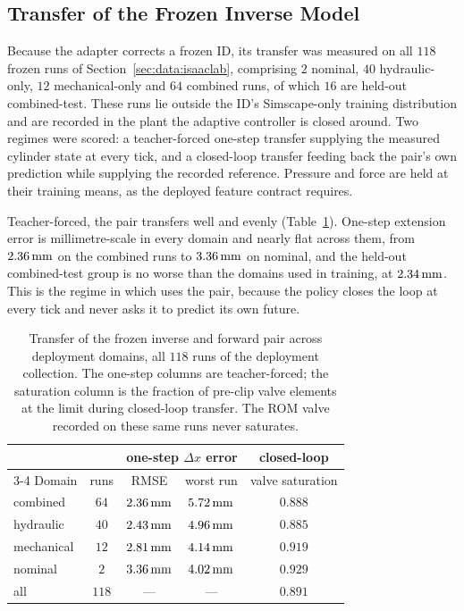 \subsection{Transfer of the Frozen Inverse Model}
\label{sec:models:id-trust}

Because the adapter corrects a frozen ID, its transfer was measured on all $118$
frozen runs of Section~\ref{sec:data:isaaclab}, comprising $2$ nominal, $40$
hydraulic-only, $12$ mechanical-only and $64$ combined runs, of which $16$ are
held-out combined-test. These runs lie outside the ID's Simscape-only training
distribution and are recorded in the plant the adaptive controller is closed
around. Two regimes were scored: a teacher-forced one-step transfer supplying
the measured cylinder state at every tick, and a closed-loop transfer feeding
back the pair's own prediction while supplying the recorded reference. Pressure
and force are held at their training means, as the deployed feature contract
requires.

Teacher-forced, the pair transfers well and evenly
(Table~\ref{tab:models:id-trust}). One-step extension error is millimetre-scale
in every domain and nearly flat across them, from $\unit[2.36]{mm}$ on the
combined runs to $\unit[3.36]{mm}$ on nominal, and the held-out combined-test
group is no worse than the domains used in training, at $\unit[2.34]{mm}$. This
is the regime in which \ppoIDFD{} uses the pair, because the policy closes the
loop at every tick and never asks it to predict its own future.

\begin{table}[tb]
  \centering
  \caption{Transfer of the frozen inverse and forward pair across deployment
  domains, all $118$ runs of the deployment collection. The one-step columns
  are teacher-forced; the saturation column is the fraction of pre-clip valve
  elements at the limit during closed-loop transfer. The ROM valve recorded on
  these same runs never saturates.}
  \label{tab:models:id-trust}
  \begin{tabular}{lcccc}
    \toprule
    & & \multicolumn{2}{c}{one-step $\Delta x$ error}
    & closed-loop \\
    \cmidrule(lr){3-4}
    Domain & runs & RMSE & worst run & valve saturation \\
    \midrule
    combined   & $64$ & $\unit[2.36]{mm}$ & $\unit[5.72]{mm}$ & $0.888$ \\
    hydraulic  & $40$ & $\unit[2.43]{mm}$ & $\unit[4.96]{mm}$ & $0.885$ \\
    mechanical & $12$ & $\unit[2.81]{mm}$ & $\unit[4.14]{mm}$ & $0.919$ \\
    nominal    & $2$  & $\unit[3.36]{mm}$ & $\unit[4.02]{mm}$ & $0.929$ \\
    \midrule
    all        & $118$ & --- & --- & $0.891$ \\
    \bottomrule
  \end{tabular}
\end{table}

